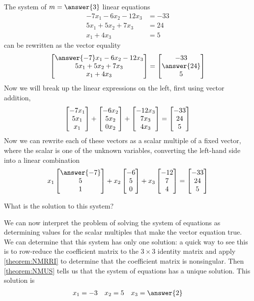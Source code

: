\documentclass{ximera}
\begin{document}
\begin{example}
  The system of $m=\answer{3}$ linear equations
  \begin{align*}
    -7x_1 -6 x_2 - 12x_3 &=-33\\
    5x_1  + 5x_2 + 7x_3 &=24\\
    x_1 +4x_3 &=5
  \end{align*}
  can be rewritten as the vector equality
  \[
    \colvector{\answer{-7}x_1 -6 x_2 - 12x_3\\ 5x_1  + 5x_2 + 7x_3\\ x_1 +4x_3}
    =
    \colvector{-33\\\answer{24}\\5}
  \]
  Now we will break up the linear expressions on the left, first using vector addition,
  \[
    \begin{bmatrix}-7x_1\\ 5x_1\\x_1\end{bmatrix}+
    \begin{bmatrix}-6 x_2\\5x_2\\0x_2\end{bmatrix}+
    \begin{bmatrix}-12x_3\\7x_3\\4x_3\end{bmatrix}
    =
    \begin{bmatrix}-33\\24\\5\end{bmatrix}
  \]
  Now we can rewrite each of these vectors as a scalar multiple of a
  fixed vector, where the scalar is one of the unknown variables,
  converting the left-hand side into a linear combination
  \[
    x_1\colvector{\answer{-7}\\5\\1}+
    x_2\colvector{-6\\5\\0}+
    x_3\colvector{-12\\7\\4}
    =
    \colvector{-33\\24\\5}
  \]
  
  \begin{question}
    What is the solution to this system?

    We can now interpret the problem of solving the system of
    equations as determining values for the scalar multiples that make
    the vector equation true.  We can determine that this system has
    only one solution: a quick way to see this is to row-reduce the
    coefficient matrix to the $3\times 3$ identity matrix and apply
    \ref{theorem:NMRRI} to determine that the coefficient matrix is
    nonsingular.  Then \ref{theorem:NMUS} tells us that the system of
    equations has a unique solution.  This solution is
    \begin{align*}
      x_1 = -3&&x_2 = 5&&x_3 = \answer{2}
    \end{align*}


\end{question}
\end{example}
\end{document}
